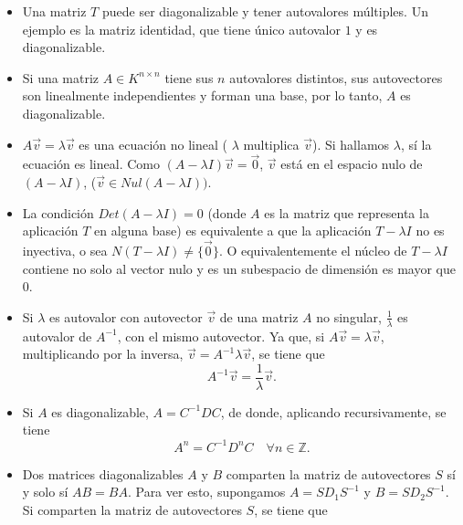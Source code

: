 \begin{remark}
\begin{itemize}
\item
Una matriz $T$ puede ser diagonalizable y tener autovalores múltiples. Un ejemplo es la matriz identidad, que tiene único autovalor $1$ y es diagonalizable.

\bigskip

\item

Si una matriz $A  \in K^{ n \times n}$ tiene  sus $n$ autovalores distintos, sus autovectores son linealmente independientes y  forman una base, por lo tanto, $A$ es diagonalizable.

\bigskip

\item $A\vec{v}=\lambda \vec{v}$  es una ecuación no lineal ( $ \lambda$ multiplica $ \vec{v} $). Si hallamos $ \lambda$, sí la ecuación es lineal. Como $(A-\lambda I) \vec{v}=\vec{0}$, $ \vec{v}$ está en el espacio nulo  de $(A-\lambda I)$, ($   \vec{v} \in Nul (A-\lambda I))$. 

\bigskip

\item
 

La condición $Det(A-\lambda I)=0$ (donde $A$ es la matriz que representa la aplicación $T$ en alguna base) es equivalente a que la aplicación $T-\lambda I$ no es inyectiva, o sea  $N(T-\lambda I)\neq \{\vec{0}\}$. O equivalentemente el núcleo de  $T-\lambda I$ contiene no solo al vector nulo y es un subespacio de dimensión es mayor que $0$.

\bigskip

\item
Si $\lambda $ es autovalor con autovector $\vec{v}$  de una matriz $A$ no singular, $ \frac{1}{\lambda }$  es autovalor de $A^{-1}$, con el mismo autovector. Ya que,  si  $A\vec{v}=\lambda \vec{v}$, multiplicando por la inversa,  $  \vec{v}= A^{-1}\lambda \vec{v}$, se tiene que \[ A^{-1} \vec{v} = \frac{1}{\lambda} \vec{v}. \]


\bigskip

\item

Si $A$ es diagonalizable, $A= C^{-1}D C$, de donde, aplicando recursivamente, se tiene  $$A^n=C^{-1}D^n C  \quad \forall n \in \mathbb{Z}.$$

\bigskip

\item

Dos matrices diagonalizables $A$ y $B$ comparten la matriz de autovectores $S$ sí y solo sí  $AB= BA$.
Para ver esto, supongamos $A=  SD_1S^{-1}$ y $B= SD_2 S^{-1}$. Si comparten la matriz de autovectores $S$, se tiene que  
\bigskip


\end{itemize}
\end{remark}
